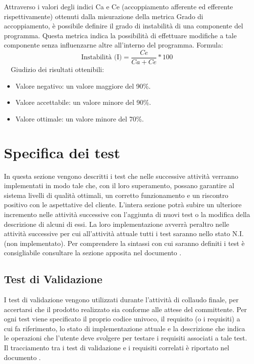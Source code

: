 \documentclass[a4paper, titlepage]{article}
\begin{document}
Attraverso i valori degli indici Ca e Ce (accoppiamento afferente ed efferente rispettivamente) ottenuti dalla misurazione della metrica Grado di accoppiamento, è possibile definire il grado di instabilità di una componente del programma. Questa metrica indica la possibilità di effettuare modifiche a tale componente senza influenzarne altre all’interno del programma.
\newline Formula:
\begin{displaymath}
\mbox{Instabilità (I)}=\frac{Ce}{Ca+Ce}*100
\end{displaymath}
\
\
\newline Giudizio dei risultati ottenibili:
\begin{itemize}
\item Valore negativo: un valore maggiore del 90\%.
\item Valore accettabile: un valore minore del 90\%.
\item Valore ottimale: un valore minore del 70\%.
\end{itemize}

 
\newpage
\section{Specifica dei test}
In questa sezione vengono descritti i test che nelle successive attività verranno implementati in modo tale che, con il loro superamento, possano garantire al sistema  livelli di qualità ottimali, un corretto funzionamento e un riscontro positivo con le aspettative del cliente.
\newline L'intera sezione potrà subire un ulteriore incremento nelle attività successive con l'aggiunta di nuovi test o la modifica della descrizione di alcuni di essi. La loro implementazione avverrà peraltro nelle attività successive per cui all'attività attuale tutti i test saranno nello stato N.I. (non implementato).
\newline Per comprendere la sintassi con cui saranno definiti i test è consigliabile consultare la sezione apposita nel documento \doc{Norme di Progetto}.

\subsection{Test di Validazione}
I test di validazione vengono utilizzati durante l'attività di collaudo finale, per accertarsi che il prodotto realizzato sia conforme alle attese del committente.
\newline Per ogni test viene specificato il proprio codice univoco, il requisito (o i requisiti) a cui fa riferimento, lo stato di implementazione attuale e la descrizione che indica le operazioni che l'utente deve svolgere per testare i requisiti associati a tale test. 
\newline Il tracciamento tra i test di validazione e i requisiti correlati è riportato nel documento \doc{Analisi dei Requisiti}.
\end{document}
